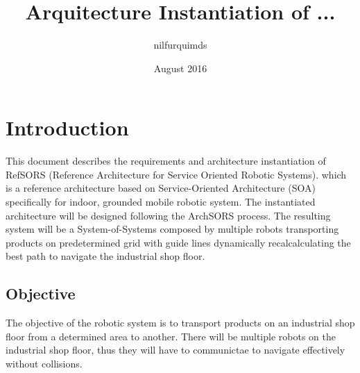 \documentclass{article}
\title{Arquitecture Instantiation of ...}
\author{nilfurquimds}
\date{August 2016}
\begin{document}
\maketitle

\section*{Introduction}
This document describes the requirements and architecture instantiation of RefSORS (Reference Architecture for Service Oriented Robotic Systems). which is a reference architecture based on Service-Oriented Architecture (SOA) specifically for indoor, grounded mobile robotic system. The instantiated architecture will be designed following the ArchSORS process. The resulting system will be a System-of-Systems composed by multiple robots transporting products on predetermined grid with guide lines dynamically recalcalculating the best path to navigate the industrial shop floor.

\subsection*{Objective}
The objective of the robotic system is to transport products on an industrial shop floor from a determined area to another. There will be multiple robots on the industrial shop floor, thus they will have to communictae to navigate effectively without collisions.



% 
% 
% 



\end{document}
